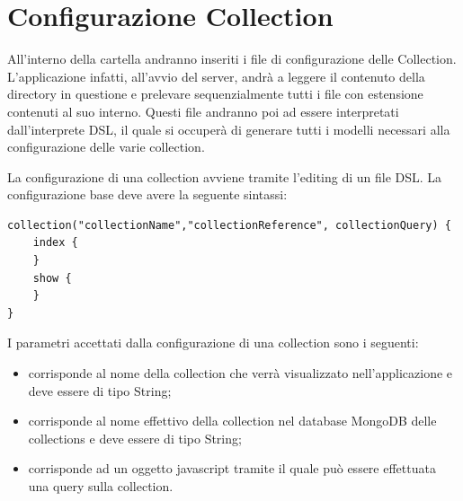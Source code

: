 \section{Configurazione Collection}
\label{collection}

All'interno della cartella  andranno inseriti i file di configurazione delle Collection. L'applicazione infatti, all'avvio del server, andrà a leggere il contenuto della directory in questione e prelevare sequenzialmente tutti i file con estensione  contenuti al suo interno. Questi file andranno poi ad essere interpretati dall'interprete DSL, il quale si occuperà di generare tutti i modelli necessari alla configurazione delle varie collection.

La configurazione di una collection avviene tramite l'editing di un file DSL. La configurazione base deve avere la seguente sintassi:
\medskip
\begin{lstlisting}
collection("collectionName","collectionReference", collectionQuery) {
	index {
	}
	show {
	}
}		
\end{lstlisting}

I parametri accettati dalla configurazione di una collection sono i seguenti: 
\begin{itemize}
\item[]  corrisponde al nome della collection che verrà visualizzato nell'applicazione e deve essere di tipo String;
\item[]  corrisponde al nome effettivo della collection nel database MongoDB delle collections e deve essere di tipo String;
\item[]  corrisponde ad un oggetto javascript tramite il quale può essere effettuata una query sulla collection.
\end{itemize}

